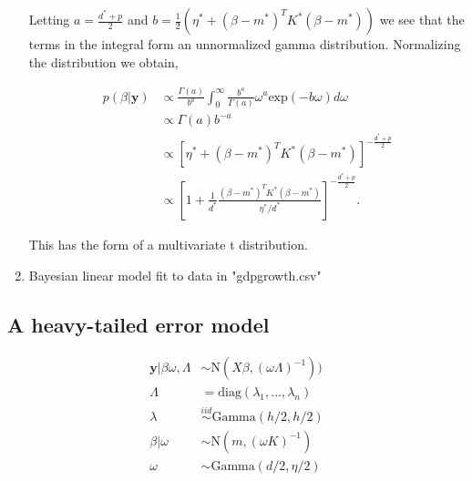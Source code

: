 \documentclass[10pt]{article}
\newcommand{\by}{\mathbf{y}}
\begin{document}
\begin{enumerate}[label=(\Alph*)]
        Letting $a = \frac{d^* + p}{2}$ and $b = \frac{1}{2}\left( \eta^* + (\beta - m^*)^T K^* (\beta - m^*) \right)$ we see that the terms in the integral form an unnormalized gamma distribution. Normalizing the distribution we obtain,

        \begin{align*}
          p(\beta | \by) &\propto \frac{\Gamma(a)}{b^a} \int_0^{\infty} \frac{b^a}{\Gamma(a)} \omega^a \text{exp}(-b \omega) d \omega \\
          & \propto \Gamma(a)b^{-a} \\
          & \propto \left [ \eta^* + (\beta - m^*)^T K^* (\beta - m^*) \right]^{-\frac{d^*+p}{2}} \\
          & \propto \left[ 1 + \frac{1}{d^*} \frac{(\beta - m^*)^T K^* (\beta - m^*)}{\eta^*/d^*}\right]^{-\frac{d^*+p}{2}}.
        \end{align*}

        This has the form of a multivariate t distribution. 

      \item Bayesian linear model fit to data in "gdpgrowth.csv"



    \end{enumerate}

    \subsection*{A heavy-tailed error model}

    \begin{align*}
      \by| \beta \omega, \Lambda &\sim \text{N}(X \beta, (\omega \Lambda)^{-1}))\\
      \Lambda &= \text{diag}(\lambda_1,...,\lambda_n)\\
      \lambda &\stackrel{iid}{\sim} \text{Gamma}(h/2, h/2)\\
      \beta | \omega &\sim \text{N}(m, (\omega K)^{-1})\\
      \omega &\sim \text{Gamma}(d/2, \eta/2)
    \end{align*}
\end{document}
